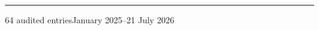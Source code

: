 \documentclass[11pt,a4paper]{article}
\begin{document}
\begin{titlepage}
\begin{minipage}{\paperwidth}
\begin{minipage}{167mm}
  \vfill
  \vspace{8mm}
  {\color{Rule}\rule{\linewidth}{0.6pt}}\par\vspace{3mm}
  {\fontsize{8.5}{11}\selectfont\color{Muted}64 audited entries\hfill January 2025--21 July 2026}
\end{minipage}
\end{minipage}

\end{titlepage}
\end{document}
